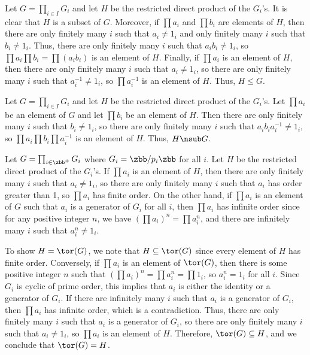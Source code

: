\begin{solenum}
    \item Let $G = \prod_{i \in I} G_i$ and let $H$ be the restricted direct product of the $G_i$'s.
	It is clear that $H$ is a subset of $G$.
	Moreover, if $\prod a_i$ and $\prod b_i$ are elements of $H$, then there are only finitely many $i$ such that $a_i \neq 1_i$ and only finitely many $i$ such that $b_i \neq 1_i$.
	Thus, there are only finitely many $i$ such that $a_i b_i \neq 1_i$, so $\prod a_i \prod b_i = \prod (a_i b_i)$ is an element of $H$.
	Finally, if $\prod a_i$ is an element of $H$, then there are only finitely many $i$ such that $a_i \neq 1_i$, so there are only finitely many $i$ such that $a_i^{-1} \neq 1_i$, so $\prod a_i^{-1}$ is an element of $H$.
	Thus, $H \leq G$.
    \item Let $G = \prod_{i \in I} G_i$ and let $H$ be the restricted direct product of the $G_i$'s.
	Let $\prod a_i$ be an element of $G$ and let $\prod b_i$ be an element of $H$.
	Then there are only finitely many $i$ such that $b_i \neq 1_i$, so there are only finitely many $i$ such that $a_i b_i a_i^{-1} \neq 1_i$, so $\prod a_i \prod b_i \prod a_i^{-1}$ is an element of $H$.
	Thus, $H \nsub G$.
    \item Let $G = \prod_{i \in \zbb^+} G_i$ where $G_i = \zbb/p_i\zbb$ for all $i$.
	Let $H$ be the restricted direct product of the $G_i$'s.
	If $\prod a_i$ is an element of $H$, then there are only finitely many $i$ such that $a_i \neq 1_i$, so there are only finitely many $i$ such that $a_i$ has order greater than 1, so $\prod a_i$ has finite order.
	On the other hand, if $\prod a_i$ is an element of $G$ such that $a_i$ is a generator of $G_i$ for all $i$, then $\prod a_i$ has infinite order since for any positive integer $n$, we have $(\prod a_i)^n = \prod a_i^n$, and there are infinitely many $i$ such that $a_i^n \neq 1_i$.
    
    To show $H = \tor(G)$, we note that $H \subseteq \tor(G)$ since every element of $H$ has finite order.
	Conversely, if $\prod a_i$ is an element of $\tor(G)$, then there is some positive integer $n$ such that $(\prod a_i)^n = \prod a_i^n = \prod 1_i$, so $a_i^n = 1_i$ for all $i$.
	Since $G_i$ is cyclic of prime order, this implies that $a_i$ is either the identity or a generator of $G_i$.
	If there are infinitely many $i$ such that $a_i$ is a generator of $G_i$, then $\prod a_i$ has infinite order, which is a contradiction.
	Thus, there are only finitely many $i$ such that $a_i$ is a generator of $G_i$, so there are only finitely many $i$ such that $a_i \neq 1_i$, so $\prod a_i$ is an element of $H$.
	Therefore, $\tor(G) \subseteq H$, and we conclude that $\tor(G) = H$.
\end{solenum}

